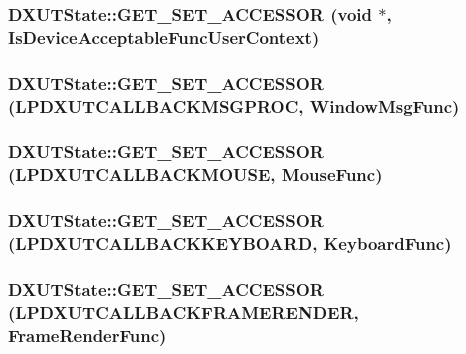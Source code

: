 \label{class_d_x_u_t_state_a5a076c00ff8b66a490d7dd6036df0e46}
\hypertarget{class_d_x_u_t_state_a6b55445b52d42d0db602d6ad1d697f22}{
\subsubsection[{GET\_\-SET\_\-ACCESSOR}]{\setlength{\rightskip}{0pt plus 5cm}DXUTState::GET\_\-SET\_\-ACCESSOR (void $\ast$, \/  IsDeviceAcceptableFuncUserContext)}}
\label{class_d_x_u_t_state_a6b55445b52d42d0db602d6ad1d697f22}
\hypertarget{class_d_x_u_t_state_ad1bb362f5ba107db996d96cd39bd8245}{
\subsubsection[{GET\_\-SET\_\-ACCESSOR}]{\setlength{\rightskip}{0pt plus 5cm}DXUTState::GET\_\-SET\_\-ACCESSOR ({\bf LPDXUTCALLBACKMSGPROC}, \/  WindowMsgFunc)}}
\label{class_d_x_u_t_state_ad1bb362f5ba107db996d96cd39bd8245}
\hypertarget{class_d_x_u_t_state_a2b21b8cf08ca2fbcc1e73e471726e6a4}{
\subsubsection[{GET\_\-SET\_\-ACCESSOR}]{\setlength{\rightskip}{0pt plus 5cm}DXUTState::GET\_\-SET\_\-ACCESSOR ({\bf LPDXUTCALLBACKMOUSE}, \/  MouseFunc)}}
\label{class_d_x_u_t_state_a2b21b8cf08ca2fbcc1e73e471726e6a4}
\hypertarget{class_d_x_u_t_state_a5c443318566115123606d590d7543e1f}{
\subsubsection[{GET\_\-SET\_\-ACCESSOR}]{\setlength{\rightskip}{0pt plus 5cm}DXUTState::GET\_\-SET\_\-ACCESSOR ({\bf LPDXUTCALLBACKKEYBOARD}, \/  KeyboardFunc)}}
\label{class_d_x_u_t_state_a5c443318566115123606d590d7543e1f}
\hypertarget{class_d_x_u_t_state_afe19dfed1649c90abbef63930ea59013}{
\subsubsection[{GET\_\-SET\_\-ACCESSOR}]{\setlength{\rightskip}{0pt plus 5cm}DXUTState::GET\_\-SET\_\-ACCESSOR ({\bf LPDXUTCALLBACKFRAMERENDER}, \/  FrameRenderFunc)}}
